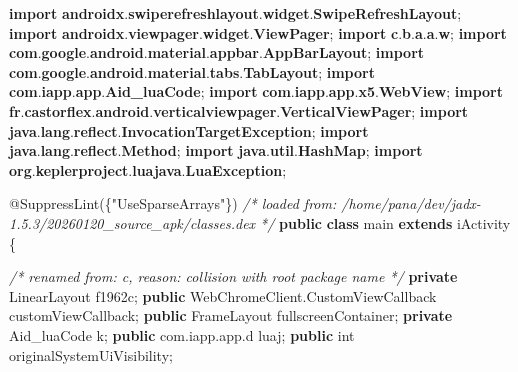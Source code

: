 \documentclass[
]{article}
\newenvironment{Shaded}{}{}
\newcommand{\AttributeTok}[1]{\textcolor[rgb]{0.49,0.56,0.16}{#1}}
\newcommand{\CommentTok}[1]{\textcolor[rgb]{0.38,0.63,0.69}{\textit{#1}}}
\newcommand{\DataTypeTok}[1]{\textcolor[rgb]{0.56,0.13,0.00}{#1}}
\newcommand{\FunctionTok}[1]{\textcolor[rgb]{0.02,0.16,0.49}{#1}}
\newcommand{\ImportTok}[1]{\textcolor[rgb]{0.00,0.50,0.00}{\textbf{#1}}}
\newcommand{\KeywordTok}[1]{\textcolor[rgb]{0.00,0.44,0.13}{\textbf{#1}}}
\newcommand{\NormalTok}[1]{#1}
\newcommand{\OperatorTok}[1]{\textcolor[rgb]{0.40,0.40,0.40}{#1}}
\newcommand{\StringTok}[1]{\textcolor[rgb]{0.25,0.44,0.63}{#1}}
\begin{document}
\begin{Shaded}
\begin{Highlighting}[]
\KeywordTok{import} \ImportTok{androidx}\OperatorTok{.}\ImportTok{swiperefreshlayout}\OperatorTok{.}\ImportTok{widget}\OperatorTok{.}\ImportTok{SwipeRefreshLayout}\OperatorTok{;}
\KeywordTok{import} \ImportTok{androidx}\OperatorTok{.}\ImportTok{viewpager}\OperatorTok{.}\ImportTok{widget}\OperatorTok{.}\ImportTok{ViewPager}\OperatorTok{;}
\KeywordTok{import} \ImportTok{c}\OperatorTok{.}\ImportTok{b}\OperatorTok{.}\ImportTok{a}\OperatorTok{.}\ImportTok{a}\OperatorTok{.}\ImportTok{w}\OperatorTok{;}
\KeywordTok{import} \ImportTok{com}\OperatorTok{.}\ImportTok{google}\OperatorTok{.}\ImportTok{android}\OperatorTok{.}\ImportTok{material}\OperatorTok{.}\ImportTok{appbar}\OperatorTok{.}\ImportTok{AppBarLayout}\OperatorTok{;}
\KeywordTok{import} \ImportTok{com}\OperatorTok{.}\ImportTok{google}\OperatorTok{.}\ImportTok{android}\OperatorTok{.}\ImportTok{material}\OperatorTok{.}\ImportTok{tabs}\OperatorTok{.}\ImportTok{TabLayout}\OperatorTok{;}
\KeywordTok{import} \ImportTok{com}\OperatorTok{.}\ImportTok{iapp}\OperatorTok{.}\ImportTok{app}\OperatorTok{.}\ImportTok{Aid\_luaCode}\OperatorTok{;}
\KeywordTok{import} \ImportTok{com}\OperatorTok{.}\ImportTok{iapp}\OperatorTok{.}\ImportTok{app}\OperatorTok{.}\ImportTok{x5}\OperatorTok{.}\ImportTok{WebView}\OperatorTok{;}
\KeywordTok{import} \ImportTok{fr}\OperatorTok{.}\ImportTok{castorflex}\OperatorTok{.}\ImportTok{android}\OperatorTok{.}\ImportTok{verticalviewpager}\OperatorTok{.}\ImportTok{VerticalViewPager}\OperatorTok{;}
\KeywordTok{import} \ImportTok{java}\OperatorTok{.}\ImportTok{lang}\OperatorTok{.}\ImportTok{reflect}\OperatorTok{.}\ImportTok{InvocationTargetException}\OperatorTok{;}
\KeywordTok{import} \ImportTok{java}\OperatorTok{.}\ImportTok{lang}\OperatorTok{.}\ImportTok{reflect}\OperatorTok{.}\ImportTok{Method}\OperatorTok{;}
\KeywordTok{import} \ImportTok{java}\OperatorTok{.}\ImportTok{util}\OperatorTok{.}\ImportTok{HashMap}\OperatorTok{;}
\KeywordTok{import} \ImportTok{org}\OperatorTok{.}\ImportTok{keplerproject}\OperatorTok{.}\ImportTok{luajava}\OperatorTok{.}\ImportTok{LuaException}\OperatorTok{;}

\AttributeTok{@SuppressLint}\OperatorTok{(\{}\StringTok{"UseSparseArrays"}\OperatorTok{\})}
\CommentTok{/* loaded from: /home/pana/dev/jadx{-}1.5.3/20260120\_source\_apk/classes.dex */}
\KeywordTok{public} \KeywordTok{class}\NormalTok{ main }\KeywordTok{extends}\NormalTok{ iActivity }\OperatorTok{\{}

    \CommentTok{/* renamed from: c, reason: collision with root package name */}
    \KeywordTok{private}\NormalTok{ LinearLayout f1962c}\OperatorTok{;}
    \KeywordTok{public}\NormalTok{ WebChromeClient}\OperatorTok{.}\FunctionTok{CustomViewCallback}\NormalTok{ customViewCallback}\OperatorTok{;}
    \KeywordTok{public}\NormalTok{ FrameLayout fullscreenContainer}\OperatorTok{;}
    \KeywordTok{private}\NormalTok{ Aid\_luaCode k}\OperatorTok{;}
    \KeywordTok{public}\NormalTok{ com}\OperatorTok{.}\FunctionTok{iapp}\OperatorTok{.}\FunctionTok{app}\OperatorTok{.}\FunctionTok{d}\NormalTok{ luaj}\OperatorTok{;}
    \KeywordTok{public} \DataTypeTok{int}\NormalTok{ originalSystemUiVisibility}\OperatorTok{;}


\end{Highlighting}
\end{Shaded}
\end{document}
